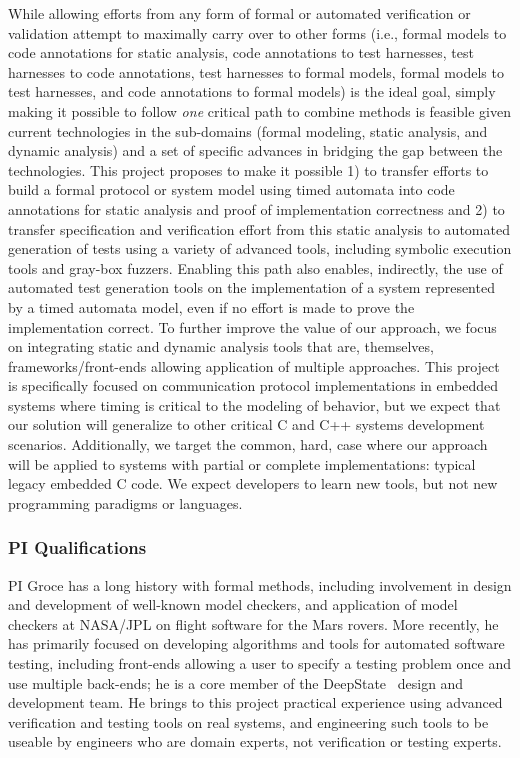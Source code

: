 While allowing efforts from any form of formal or automated verification or validation attempt to maximally carry over to other forms (i.e., formal models to code annotations for static analysis, code annotations to test harnesses, test harnesses to code annotations, test harnesses to formal models, formal models to test harnesses, and code annotations to formal models) is the ideal goal, simply making it possible to follow \emph{one} critical path to combine methods is feasible given current technologies in the sub-domains (formal modeling, static analysis, and dynamic analysis) and a set of specific advances in bridging the gap between the technologies.  This project proposes to make it possible 1) to transfer efforts to build a formal protocol or system model using timed automata into code annotations for static analysis and proof of implementation correctness and 2) to transfer specification and verification effort from this static analysis to automated generation of tests using a variety of advanced tools, including symbolic execution tools and gray-box fuzzers.  Enabling this path also enables, indirectly, the use of automated test generation tools on the implementation of a system represented by a timed automata model, even if no effort is made to prove the implementation correct.  To further improve the value of our approach, we focus on integrating static and dynamic analysis tools that are, themselves, frameworks/front-ends allowing application of multiple approaches.  This project is specifically focused on communication protocol implementations in embedded systems where timing is critical to the modeling of behavior, but we expect that our solution will generalize to other critical C and C++ systems development scenarios.  Additionally, we target the common, hard, case where our approach will be applied to systems with partial or complete implementations: typical legacy embedded C code.  We expect developers to learn new tools, but not new programming paradigms or languages.

\subsubsection{PI Qualifications}

PI Groce has a long history with formal methods, including involvement in design and development of well-known model checkers, and application of model checkers at NASA/JPL on flight software for the Mars rovers.  More recently, he has primarily focused on developing algorithms and tools for automated software testing, including front-ends allowing a user to specify a testing problem once and use multiple back-ends; he is a core member of the DeepState~\cite{DeepState,deepstatetutorial,deepstaterepo} design and development team.  He brings to this project practical experience using advanced verification and testing tools on real systems, and engineering such tools to be useable by engineers who are domain experts, not verification or testing experts.

